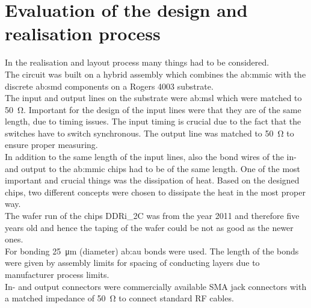 \section{Evaluation of the design and realisation process}
In the realisation and layout process many things had to be considered.\\
The circuit was built on a hybrid assembly which combines the \gls{ab:mmic} with the discrete \gls{ab:smd} components on a Rogers 4003 substrate.\\
The input and output lines on the substrate were \gls{ab:msl} which were matched to \SI{50}{\ohm}.
Important for the design of the input lines were that they are of the same length, due to timing issues.
The input timing is crucial due to the fact that the switches have to switch synchronous.
The output line was matched to \SI{50}{\ohm} to ensure proper measuring.\\
In addition to the same length of the input lines, also the bond wires of the in- and output to the \gls{ab:mmic} chips had to be of the same length.
One of the most important and crucial things was the dissipation of heat.
Based on the designed chips, two different concepts were chosen to dissipate the heat in the most proper way.\\
The wafer run of the chips DDRi\_2C was from the year 2011 and therefore five years old and hence the taping of the wafer could be not as good as the newer ones.\\
For bonding \SI{25}{\micro \metre} (diameter) \gls{ab:au} bonds were used.
The length of the bonds were given by assembly limits for spacing of conducting layers due to manufacturer process limits.\\
In- and output connectors were commercially available SMA jack connectors with a matched impedance of \SI{50}{\ohm} to connect standard RF cables.\\

